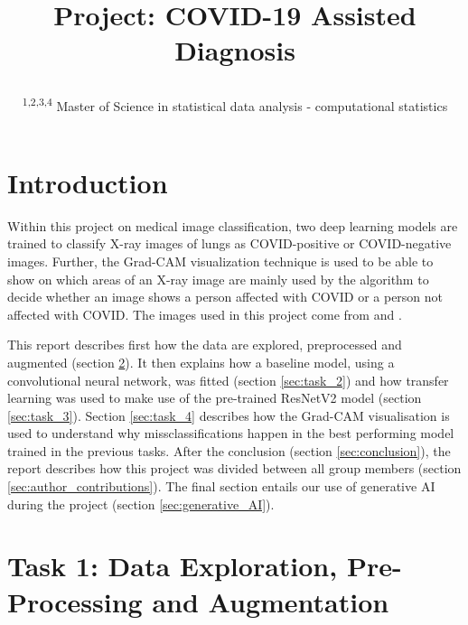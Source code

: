 \documentclass[conference]{IEEEtran}
\begin{document}
\title{Project: COVID-19 Assisted Diagnosis\\


\author{
\and
{}
\and
{}
\and
{}

\and


\textsuperscript{1,2,3,4}  Master of Science in statistical data analysis - computational statistics\hfill}}

\maketitle



\section{Introduction}
Within this project on medical image classification, two deep learning models are trained to classify X-ray images of lungs as COVID-positive or COVID-negative images. Further, the Grad-CAM visualization technique is used to be able to show on which areas of an X-ray image are mainly used by the algorithm to decide whether an image shows a person affected with COVID or a person not affected with COVID. The images used in this project come from \cite{dataset1} and \cite{dataset2}. 

This report describes first how the data are explored, preprocessed and augmented (section \ref{sec:task_1}). It then explains how a baseline model, using a convolutional neural network, was fitted (section \ref{sec:task_2}) and how transfer learning was used to make use of the pre-trained ResNetV2 model (section \ref{sec:task_3}). Section \ref{sec:task_4} describes how the Grad-CAM visualisation is used to understand why missclassifications happen in the best performing model trained in the previous tasks.
After the conclusion (section \ref{sec:conclusion}), the report describes how this project was divided between all group members (section \ref{sec:author_contributions}). The final section entails our use of generative AI during the project (section \ref{sec:generative_AI}).


\section{Task 1: Data Exploration, Pre-Processing and Augmentation}\label{sec:task_1}
\end{document}
